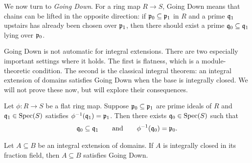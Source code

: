 \documentclass[12pt,reqno]{amsart}
\begin{document}
\hrulefill

We now turn to \emph{Going Down}. For a ring map $R\to S$, Going Down means that chains can be lifted in the opposite direction: if $\mathfrak{p}_0\subseteq \mathfrak{p}_1$ in $R$ and a prime $\mathfrak{q}_1$ upstairs has already been chosen over $\mathfrak{p}_1$, then there should exist a prime $\mathfrak{q}_0\subseteq \mathfrak{q}_1$ lying over $\mathfrak{p}_0$.

Going Down is not automatic for integral extensions. There are two especially important settings where it holds. The first is flatness, which is a module-theoretic condition. The second is the classical integral theorem: an integral extension of domains satisfies Going Down when the base is integrally closed. We will not prove these now, but will explore their consequences. 

\begin{theorem}
Let $\phi:R\to S$ be a flat ring map. Suppose $\mathfrak{p}_0\subseteq \mathfrak{p}_1$ are prime ideals of $R$ and $\mathfrak{q}_1\in\operatorname{Spec}(S)$ satisfies $\phi^{-1}(\mathfrak{q}_1)=\mathfrak{p}_1$. Then there exists $\mathfrak{q}_0\in\operatorname{Spec}(S)$ such that
\[
\mathfrak{q}_0\subseteq \mathfrak{q}_1
\qquad\text{and}\qquad
\phi^{-1}(\mathfrak{q}_0)=\mathfrak{p}_0.
\]
\end{theorem}

\begin{theorem}
Let $A\subseteq B$ be an integral extension of domains. If $A$ is integrally closed in its fraction field, then $A\subseteq B$ satisfies Going Down.
\end{theorem}

\hrulefill
\end{document}
